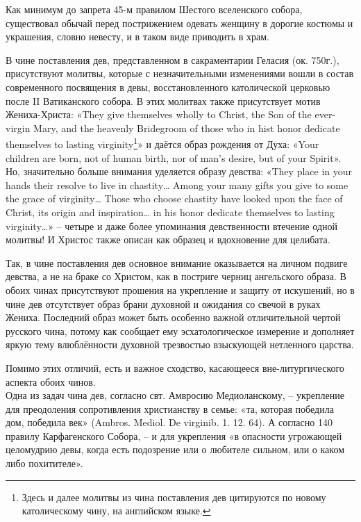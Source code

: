 Как минимум до запрета 45-м правилом Шестого вселенского собора, существовал обычай перед пострижением одевать женщину в дорогие костюмы и украшения, словно невесту, и в таком виде приводить в храм.

В чине поставления дев, представленном в сакраментарии Геласия (ок. 750г.), присутствуют молитвы, которые с незначительными изменениями вошли в состав современного посвящения в девы, восстановленного католической церковью после II Ватиканского собора.
В этих молитвах также присутствует мотив Жениха-Христа: «They give themselves wholly to Christ, the Son of the ever-virgin Mary, and the heavenly Bridegroom of those who in hist honor dedicate themselves to lasting virginity\footnote{Здесь и далее молитвы из чина поставления дев цитируются по новому католическому чину, на английском языке.}» и даётся образ рождения от Духа: «Your children are born, not of human birth, nor of man's desire, but of your Spirit».
Но, значительно больше внимания уделяется образу девства: «They place in your hands their resolve to live in chastity\ldots{} Among your many gifts you give to some the grace of virginity\ldots{} Those who choose chastity have looked upon the face of Christ, its origin and inspiration\ldots{} in his honor dedicate themselves to lasting virginity\ldots{}» -- четыре и даже более упоминания девственности втечение одной молитвы!
И Христос также описан как образец и вдохновение для целибата.

Так, в чине поставления дев основное внимание оказывается на личном подвиге девства, а не на браке со Христом, как в постриге черниц ангельского образа.
В обоих чинах присутствуют прошения на укрепление и защиту от искушений, но в чине дев отсутствует образ брани духовной и ожидания со свечой в руках Жениха.
Последний образ может быть особенно важной отличительной чертой русского чина, потому как сообщает ему эсхатологическое измерение и дополняет яркую тему влюблённости духовной трезвостью взыскующей нетленного царства.

Помимо этих отличий, есть и важное сходство, касающееся вне-литургического аспекта обоих чинов.\\
Одна из задач чина дев, согласно свт. Амвросию Медиоланскому, -- укрепление для преодоления сопротивления христианству в семье: «та, которая победила дом, победила век» (Ambros. Mediol. De virginib. 1. 12. 64).
А согласно 140 правилу Карфагенского Собора, -- и для укрепления «в опасности угрожающей целомудрию девы, когда есть подозрение или о любителе сильном, или о каком либо похитителе».


